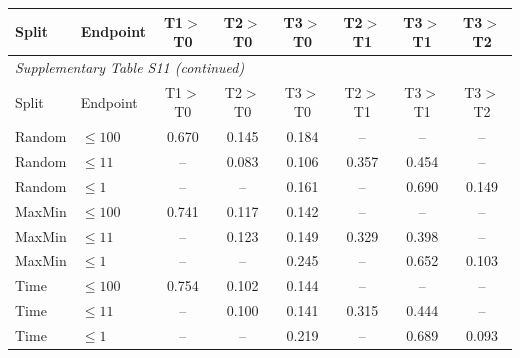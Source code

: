 \begingroup\footnotesize\setlength{\tabcolsep}{3pt}

\begin{longtable}{llcccccc}

\toprule Split & Endpoint & T1$>$T0 & T2$>$T0 & T3$>$T0 & T2$>$T1 & T3$>$T1 & T3$>$T2 \\ \midrule\endfirsthead

\multicolumn{8}{l}{\textit{Supplementary Table S11 (continued)}} \\

\toprule Split & Endpoint & T1$>$T0 & T2$>$T0 & T3$>$T0 & T2$>$T1 & T3$>$T1 & T3$>$T2 \\ \midrule\endhead

\bottomrule\endlastfoot

Random & $\leq100$ & 0.670 & 0.145 & 0.184 & -- & -- & -- \\
Random & $\leq11$ & -- & 0.083 & 0.106 & 0.357 & 0.454 & -- \\
Random & $\leq1$ & -- & -- & 0.161 & -- & 0.690 & 0.149 \\
MaxMin & $\leq100$ & 0.741 & 0.117 & 0.142 & -- & -- & -- \\
MaxMin & $\leq11$ & -- & 0.123 & 0.149 & 0.329 & 0.398 & -- \\
MaxMin & $\leq1$ & -- & -- & 0.245 & -- & 0.652 & 0.103 \\
Time & $\leq100$ & 0.754 & 0.102 & 0.144 & -- & -- & -- \\
Time & $\leq11$ & -- & 0.100 & 0.141 & 0.315 & 0.444 & -- \\
Time & $\leq1$ & -- & -- & 0.219 & -- & 0.689 & 0.093 \\

\end{longtable}\endgroup

